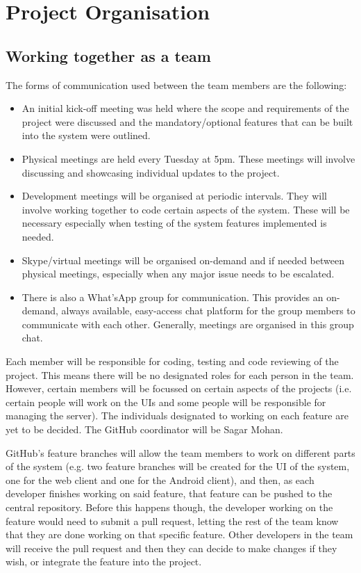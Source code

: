 \documentclass[11pt,a4paper]{article}
\begin{document}
\section{Project Organisation}
\subsection{Working together as a team}
The forms of communication used between the team members are the following:
\begin{itemize}
\item An initial kick-off meeting was held where the scope and requirements of the project were discussed and the mandatory/optional features that can be built into the system were outlined.
\item Physical meetings are held every Tuesday at 5pm. These meetings will involve discussing and showcasing individual updates to the project. 
\item Development meetings will be organised at periodic intervals. They will involve working together to code certain aspects of the system. These will be necessary especially when testing of the system features implemented is needed.
\item Skype/virtual meetings will be organised on-demand and if needed between physical meetings, especially when any major issue needs to be escalated. 
\item There is also a What'sApp group for communication. This provides an on-demand, always available, easy-access chat platform for the group members to communicate with each other. Generally, meetings are organised in this group chat.
\end{itemize}
Each member will be responsible for coding, testing and code reviewing of the project. This means there will be no designated roles for each person in the team. However, certain members will be focussed on certain aspects of the projects (i.e. certain people will work on the UIs and some people will be responsible for managing the server). The individuals designated to working on each feature are yet to be decided. The GitHub coordinator will be Sagar Mohan.

GitHub’s feature branches will allow the team members to work on different parts of the system (e.g. two feature branches will be created for the UI of the system, one for the web client and one for the Android client), and then, as each developer finishes working on said feature, that feature can be pushed to the central repository. Before this happens though, the developer working on the feature would need to submit a pull request, letting the rest of the team know that they are done working on that specific feature. Other developers in the team will receive the pull request and then they can decide to make changes if they wish, or integrate the feature into the project.
\end{document}
